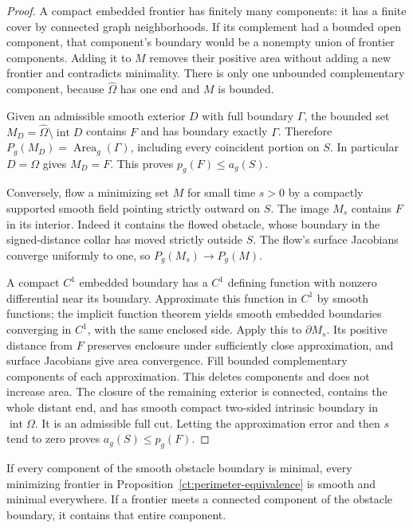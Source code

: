 \begin{proof}
A compact embedded frontier has finitely many components: it has a
finite cover by connected graph neighborhoods. If its complement had
a bounded open component, that component's boundary would be a nonempty
union of frontier components. Adding it to $M$ removes their positive
area without adding a new frontier and contradicts minimality.
There is only one unbounded complementary component, because
$\widehat\Omega$ has one end and $M$ is bounded.

Given an admissible smooth exterior $D$ with full boundary $\Gamma$,
the bounded set
$M_D=\widehat\Omega\setminus\operatorname{int}D$ contains $F$ and has
boundary exactly $\Gamma$. Therefore
$P_g(M_D)=\operatorname{Area}_g(\Gamma)$, including every coincident
portion on $S$. In particular $D=\Omega$ gives $M_D=F$.
This proves $p_g(F)\leq a_g(S)$.

Conversely, flow a minimizing set $M$ for small time $s>0$ by a
compactly supported smooth field pointing strictly outward on $S$.
The image $M_s$ contains $F$ in its interior. Indeed it contains the
flowed obstacle, whose boundary in the signed-distance collar has
moved strictly outside $S$. The flow's surface Jacobians converge
uniformly to one, so $P_g(M_s)\to P_g(M)$.

A compact $C^1$ embedded boundary has a $C^1$ defining function with
nonzero differential near its boundary. Approximate this function in
$C^1$ by smooth functions; the implicit function theorem yields smooth
embedded boundaries converging in $C^1$, with the same enclosed side.
Apply this to $\partial M_s$. Its positive distance from $F$ preserves
enclosure under sufficiently close approximation, and surface
Jacobians give area convergence. Fill bounded complementary components
of each approximation. This deletes components and does not increase
area. The closure of the remaining exterior is connected, contains
the whole distant end, and has smooth compact two-sided intrinsic
boundary in $\operatorname{int}\Omega$. It is an admissible full cut.
Letting the approximation error and then $s$ tend to zero proves
$a_g(S)\leq p_g(F)$.
\end{proof}

\begin{corollary}
\label{ct:minimal-obstacle}
If every component of the smooth obstacle boundary is minimal, every
minimizing frontier in Proposition~\ref{ct:perimeter-equivalence} is
smooth and minimal everywhere. If a frontier meets a connected
component of the obstacle boundary, it contains that entire component.
\end{corollary}

